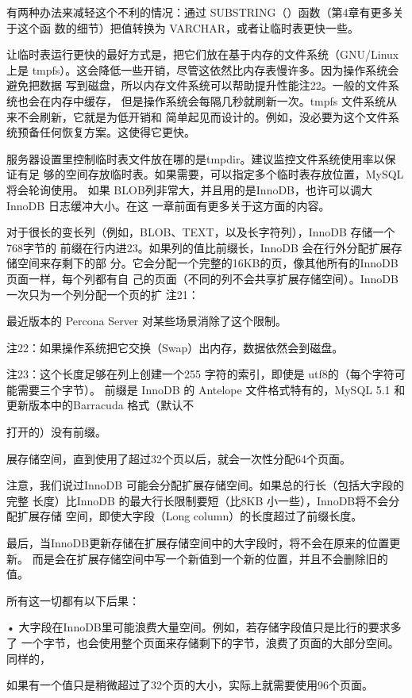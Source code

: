 有两种办法来减轻这个不利的情况：通过 SUBSTRING（）函数（第4章有更多关于这个函
数的细节）把值转换为 VARCHAR，或者让临时表更快一些。

让临时表运行更快的最好方式是，把它们放在基于内存的文件系统（GNU/Linux 上是
tmpfs）。这会降低一些开销，尽管这依然比内存表慢许多。因为操作系统会避免把数据
写到磁盘，所以内存文件系统可以帮助提升性能注22。一般的文件系统也会在内存中缓存，
但是操作系统会每隔几秒就刷新一次。tmpfs 文件系统从来不会刷新，它就是为低开销和
简单起见而设计的。例如，没必要为这个文件系统预备任何恢复方案。这使得它更快。

服务器设置里控制临时表文件放在哪的是tmpdir。建议监控文件系统使用率以保证有足
够的空间存放临时表。如果需要，可以指定多个临时表存放位置，MySQL 将会轮询使用。
如果 BLOB列非常大，并且用的是InnoDB，也许可以调大InnoDB 日志缓冲大小。在这
一章前面有更多关于这方面的内容。

对于很长的变长列（例如，BLOB、TEXT，以及长字符列），InnoDB 存储一个768字节的
前缀在行内进23。如果列的值比前缀长，InnoDB 会在行外分配扩展存储空间来存剩下的部
分。它会分配一个完整的16KB的页，像其他所有的InnoDB页面一样，每个列都有自
己的页面（不同的列不会共享扩展存储空间）。InnoDB一次只为一个列分配一个页的扩
注21：

最近版本的 Percona Server 对某些场景消除了这个限制。

注22：如果操作系统把它交换（Swap）出内存，数据依然会到磁盘。

注23：这个长度足够在列上创建一个255 字符的索引，即使是 utf8的（每个字符可能需要三个字节）。
前缀是 InnoDB 的 Antelope 文件格式特有的，MySQL 5.1 和更新版本中的Barracuda 格式（默认不

打开的）没有前缀。

展存储空间，直到使用了超过32个页以后，就会一次性分配64个页面。

注意，我们说过InnoDB 可能会分配扩展存储空间。如果总的行长（包括大字段的完整
长度）比InnoDB 的最大行长限制要短（比8KB 小一些），InnoDB将不会分配扩展存储
空间，即使大字段（Long column）的长度超过了前缀长度。

最后，当InnoDB更新存储在扩展存储空间中的大字段时，将不会在原来的位置更新。
而是会在扩展存储空间中写一个新值到一个新的位置，并且不会删除旧的值。

所有这一切都有以下后果：

• 大字段在InnoDB里可能浪费大量空间。例如，若存储字段值只是比行的要求多了
一个字节，也会使用整个页面来存储剩下的字节，浪费了页面的大部分空间。同样的，

如果有一个值只是稍微超过了32个页的大小，实际上就需要使用96个页面。

